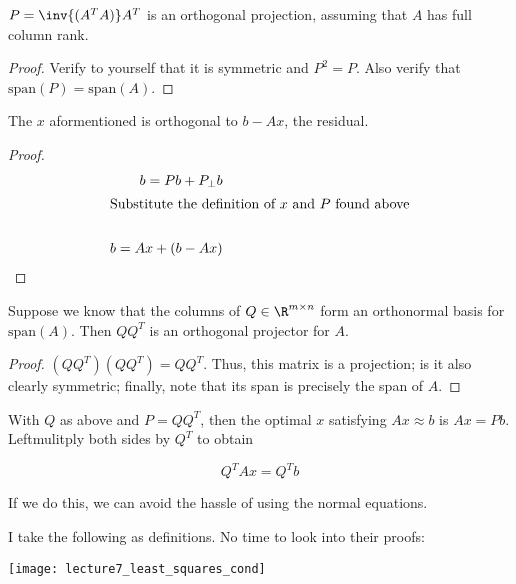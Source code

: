 \documentclass[../main.tex]{subfiles}
\begin{document}
\begin{proposition}
    $P = \inv{(A^TA)}A^T$ is an orthogonal projection, assuming
    that $A$ has full column rank.
\end{proposition}
\begin{proof}
    Verify to yourself that it is symmetric and $P^2 = P$. Also verify that $\text{span}(P) = \text{span}(A)$.
\end{proof}

\begin{corollary}
    The $x$ aformentioned is orthogonal to $b- Ax$, the residual.
\end{corollary}

\begin{proof}
    \begin{align*}
        b = Pb + P_{\perp}b \\
        \intertext{Substitute the definition of $x$ and $P$ found above}  \\
        b = Ax + (b - Ax) \\
    \end{align*}
\end{proof}

\begin{proposition}
    Suppose we know that the columns of $Q \in \R^{m \times n}$ form an orthonormal basis for $\text{span}(A)$. Then $QQ^T$ is an orthogonal projector for $A$.
\end{proposition}
\begin{proof}
    $(QQ^T)(QQ^T) = QQ^T$. Thus, this matrix is a projection; is it also clearly symmetric; finally, note that its span is precisely the span of $A$.
\end{proof}

\begin{corollary}
    With $Q$ as above and $P = QQ^T$, then the optimal $x$ satisfying $Ax \approx b$ is $Ax = Pb$. Leftmulitply both sides by $Q^T$ to obtain

    \[
        Q^TAx = Q^Tb
    \]

    If we do this, we can avoid the hassle of using the normal equations.
\end{corollary}

\begin{definition}
    I take the following as definitions. No time to look into their proofs:
    \begin{center}
        \texttt{[image: lecture7\_least\_squares\_cond]}
    \end{center}
\end{definition}
\end{document}
